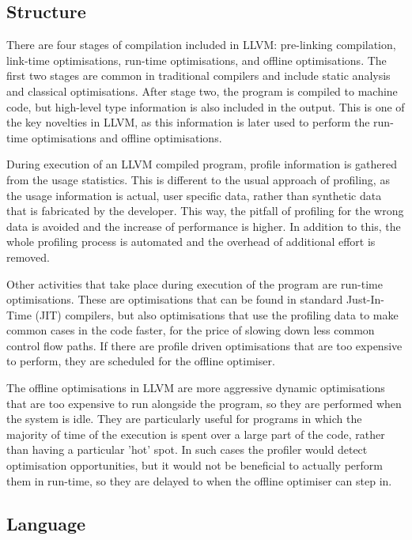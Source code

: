 \documentclass[parskip]{cs4rep}
\begin{document}
\subsection{Structure}

There are four stages of compilation included in LLVM: pre-linking compilation, link-time optimisations, run-time optimisations, and offline optimisations\cite{Lattner2002}. The first two stages are common in traditional compilers and include static analysis and classical optimisations. After stage two, the program is compiled to machine code, but high-level type information is also included in the output. This is one of the key novelties in LLVM, as this information is later used to perform the run-time optimisations and offline optimisations.

During execution of an LLVM compiled program, profile information is gathered from the usage statistics. This is different to the usual approach of profiling, as the usage information is actual, user specific data, rather than synthetic data that is fabricated by the developer. This way, the pitfall of profiling for the wrong data is avoided and the increase of performance is higher. In addition to this, the whole profiling process is automated and the overhead of additional effort is removed. 

Other activities that take place during execution of the program are run-time optimisations. These are optimisations that can be found in standard Just-In-Time (JIT) compilers, but also optimisations that use the profiling data to make common cases in the code faster, for the price of slowing down less common control flow paths. If there are profile driven optimisations that are too expensive to perform, they are scheduled for the offline optimiser.

The offline optimisations in LLVM are more aggressive dynamic optimisations that are too expensive to run alongside the program, so they are performed when the system is idle. They are particularly useful for programs in which the majority of time of the execution is spent over a large part of the code, rather than having a particular 'hot' spot. In such cases the profiler would detect optimisation opportunities, but it would not be beneficial to actually perform them in run-time, so they are delayed to when the offline optimiser can step in.

\subsection{Language} \label{sec:LLVMLanguage}
\end{document}
